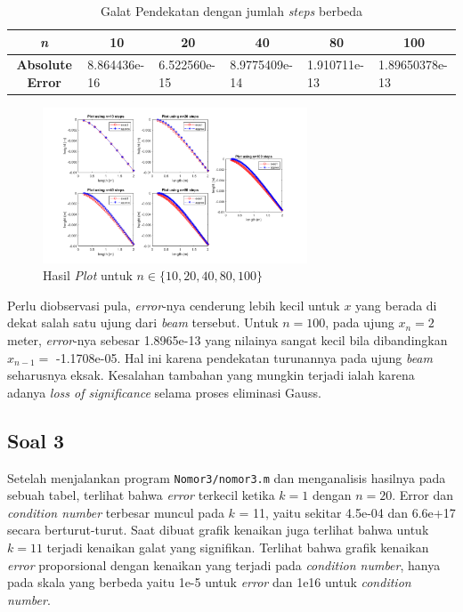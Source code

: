 \documentclass[10pt, a4paper, onecolumn, oneside, final]{report}
\begin{document}
\begin{table}[H]
\caption{Galat Pendekatan dengan jumlah \textit{steps} berbeda}
\centering
\begin{tabular}{|c|l|l|l|l|l|}
\hline
\textit{\textbf{n}}                       & \multicolumn{1}{c|}{10} & \multicolumn{1}{c|}{20} & \multicolumn{1}{c|}{40} & \multicolumn{1}{c|}{80} & \multicolumn{1}{c|}{100} \\ \hline
\textbf{Absolute Error} & 8.864436e-16 & 6.522560e-15 & 8.9775409e-14 & 1.910711e-13 & 1.89650378e-13 \\ \hline
\end{tabular}
\end{table}

\begin{figure}[H]
    \centering
    \includegraphics[width=0.7\textwidth]{Nomor2/nomor2.png}
    \caption{Hasil \textit{Plot} untuk $n \in \{10, 20, 40, 80, 100\}$}
    \label{fig:my_label}
\end{figure}

Perlu diobservasi pula, \textit{error}-nya cenderung lebih kecil untuk $x$ yang berada di dekat salah satu ujung dari \textit{beam} tersebut. Untuk $n = 100$, pada ujung $x_n = 2$ meter, \textit{error}-nya sebesar 1.8965e-13 yang nilainya sangat kecil bila dibandingkan $x_{n-1} =$ -1.1708e-05. Hal ini karena pendekatan turunannya pada ujung \textit{beam} seharusnya eksak. Kesalahan tambahan yang mungkin terjadi ialah karena adanya \textit{loss of significance} selama proses eliminasi Gauss.

\subsection*{Soal 3}

Setelah menjalankan program \texttt{Nomor3/nomor3.m} dan menganalisis hasilnya pada sebuah tabel, terlihat bahwa \textit{error} terkecil ketika $k = 1$ dengan $n = 20$. Error dan \textit{condition number} terbesar muncul pada $k$ = 11, yaitu sekitar 4.5e-04 dan 6.6e+17 secara berturut-turut. Saat dibuat grafik kenaikan juga terlihat bahwa untuk $k = 11$ terjadi kenaikan galat yang signifikan. Terlihat bahwa grafik kenaikan \textit{error} proporsional dengan kenaikan yang terjadi pada \textit{condition number}, hanya pada skala yang berbeda yaitu 1e-5 untuk \textit{error} dan 1e16 untuk \textit{condition number}.
\end{document}
